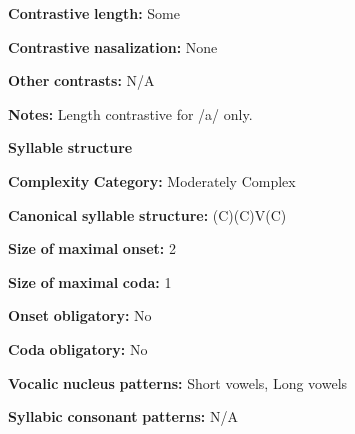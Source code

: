 \begin{styleBody}
\textbf{Contrastive} \textbf{length:} Some
\end{styleBody}

\begin{styleBody}
\textbf{Contrastive} \textbf{nasalization:} None
\end{styleBody}

\begin{styleBody}
\textbf{Other} \textbf{contrasts:} N/A
\end{styleBody}

\begin{styleBody}
\textbf{Notes:} Length contrastive for /a/ only.
\end{styleBody}

\begin{styleBody}
\textbf{Syllable} \textbf{structure}
\end{styleBody}

\begin{styleBody}
\textbf{Complexity} \textbf{Category:} Moderately Complex
\end{styleBody}

\begin{styleBody}
\textbf{Canonical} \textbf{syllable} \textbf{structure:} (C)(C)V(C) \citep[123-7]{Clark2008}
\end{styleBody}

\begin{styleBody}
\textbf{Size} \textbf{of} \textbf{maximal} \textbf{onset:} 2
\end{styleBody}

\begin{styleBody}
\textbf{Size} \textbf{of} \textbf{maximal} \textbf{coda:} 1
\end{styleBody}

\begin{styleBody}
\textbf{Onset} \textbf{obligatory:} No
\end{styleBody}

\begin{styleBody}
\textbf{Coda} \textbf{obligatory:} No
\end{styleBody}

\begin{styleBody}
\textbf{Vocalic} \textbf{nucleus} \textbf{patterns:} Short vowels, Long vowels
\end{styleBody}

\begin{styleBody}
\textbf{Syllabic} \textbf{consonant} \textbf{patterns:} N/A
\end{styleBody}

